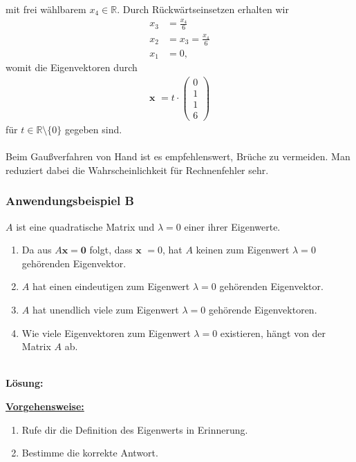 mit frei wählbarem $x_4 \in \mathbb{R}$.
Durch Rückwärtseinsetzen erhalten wir
\begin{align*}
x_3 &= \frac{x_4}{6}\\
x_2 &=  x_3 =  \frac{x_4}{6}\\
x_1 &= 0,
\end{align*}
womit die Eigenvektoren durch
\begin{align*}
\textbf{x }  = t \cdot 
\begin{pmatrix}
0 \\
1 \\ 
1 \\
6
\end{pmatrix}
\end{align*}
für $t \in \mathbb{R} \setminus \lbrace 0 \rbrace$ gegeben sind.\\
\\
Beim Gaußverfahren von Hand ist es empfehlenswert, Brüche zu vermeiden.
Man reduziert dabei die Wahrscheinlichkeit für Rechnenfehler sehr.
\newpage
\subsubsection*{Anwendungsbeispiel B}
$A$ ist eine quadratische Matrix und $\lambda = 0 $ einer ihrer Eigenwerte.

\renewcommand{\labelenumi}{(\alph{enumi})}
\begin{enumerate}
\item 
Da aus $A \textbf{x} = \textbf{0}$ folgt, dass $\textbf{x } = 0$, hat $A$ keinen zum Eigenwert $ \lambda = 0$ gehörenden Eigenvektor.
\item
$A$ hat einen eindeutigen zum Eigenwert $\lambda = 0$ gehörenden Eigenvektor.
\item
$A$ hat unendlich viele zum Eigenwert $\lambda = 0$ gehörende Eigenvektoren.
\item
Wie viele Eigenvektoren zum Eigenwert $\lambda = 0$ existieren, hängt von der Matrix $A$ ab.
\end{enumerate}
\ \\
\textbf{Lösung:}
\begin{mdframed}
\underline{\textbf{Vorgehensweise:}}
\renewcommand{\labelenumi}{\theenumi.}
\begin{enumerate}
\item Rufe dir die Definition des Eigenwerts in Erinnerung.
\item
Bestimme die korrekte Antwort.
\end{enumerate}
\end{mdframed}


